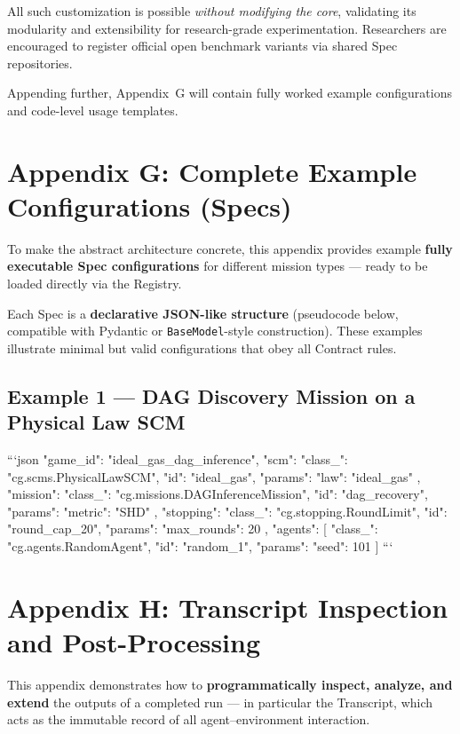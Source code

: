 \bigskip
All such customization is possible \emph{without modifying the \game core}, validating its modularity and extensibility for research-grade experimentation.
Researchers are encouraged to register official open benchmark variants via shared Spec repositories.

Appending further, Appendix~G will contain fully worked example configurations and code-level usage templates.


\section{Appendix G: Complete Example Configurations (Specs)}
\label{appendix:example_specs}

To make the abstract architecture concrete, this appendix provides example \textbf{fully executable Spec configurations}
for different mission types — ready to be loaded directly via the Registry.

Each Spec is a \textbf{declarative JSON-like structure} (pseudocode below, compatible with Pydantic or \texttt{BaseModel}-style construction).  
These examples illustrate minimal but valid configurations that obey all Contract rules.

\subsection{Example 1 — DAG Discovery Mission on a Physical Law SCM}
```json
{
  "game_id": "ideal_gas_dag_inference",
  "scm": {
    "class_": "cg.scms.PhysicalLawSCM",
    "id": "ideal_gas",
    "params": { "law": "ideal_gas" }
  },
  "mission": {
    "class_": "cg.missions.DAGInferenceMission",
    "id": "dag_recovery",
    "params": { "metric": "SHD" }
  },
  "stopping": {
    "class_": "cg.stopping.RoundLimit",
    "id": "round_cap_20",
    "params": { "max_rounds": 20 }
  },
  "agents": [
    { "class_": "cg.agents.RandomAgent", "id": "random_1", "params": { "seed": 101 } }
  ]
}
```

\section{Appendix H: Transcript Inspection and Post-Processing}
\label{appendix:transcript_postprocessing}

This appendix demonstrates how to \textbf{programmatically inspect, analyze, and extend} the outputs of a completed \game run — in particular the Transcript, which acts as the immutable record of all agent–environment interaction.

